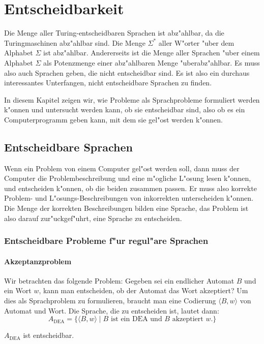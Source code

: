% 
%
\chapter{Entscheidbarkeit\label{chapter-entscheidbarkeit}}
\rhead{}
Die Menge aller Turing-entscheidbaren Sprachen ist abz"ahlbar,
da die Turingmaschinen abz"ahlbar sind.
Die Menge $\Sigma^*$ aller W"orter "uber dem Alphabet $\Sigma$ ist abz"ahlbar.
Andererseits ist die Menge aller Sprachen "uber einem Alphabet $\Sigma$
als Potenzmenge einer abz"ahlbaren Menge "uberabz"ahlbar. Es muss
also auch Sprachen geben, die nicht entscheidbar sind. Es ist also
ein durchaus interessantes Unterfangen, nicht entscheidbare Sprachen
zu finden.

In diesem Kapitel zeigen wir, wie Probleme als Sprachprobleme
formuliert werden k"onnen und untersucht werden kann, ob sie entscheidbar sind,
also ob es ein Computerprogramm geben kann, mit dem sie gel"ost werden
k"onnen.

\section{Entscheidbare Sprachen}
Wenn ein Problem von einem Computer gel"ost werden soll, dann
muss der Computer die Problembeschreibung und eine m"ogliche L"osung
lesen k"onnen, und entscheiden k"onnen, ob die beiden zusammen passen.
Er muss also korrekte Problem- und L"osungs-Beschreibungen von
inkorrekten unterscheiden k"onnen. Die Menge der korrekten
Beschreibungen bilden eine Sprache, das Problem ist also darauf
zur"uckgef"uhrt, eine Sprache zu entscheiden.

\subsection{Entscheidbare Probleme f"ur regul"are Sprachen}
\subsubsection{Akzeptanzproblem}
Wir betrachten das folgende Problem: Gegeben sei ein endlicher Automat $B$ und ein Wort $w$,
kann man entscheiden, ob der Automat das Wort akzeptiert?
Um dies als Sprachproblem zu formulieren, braucht  man eine Codierung
$\langle B,w\rangle$ von Automat und Wort. Die Sprache, die zu
entscheiden ist, lautet dann:
\[
A_{\text{DEA}} =\{
\langle B,w\rangle\;|\;\text{$B$ ist ein DEA und $B$ akzeptiert $w$}.
\}
\]
\begin{satz}
\label{adea_decidable}
$A_{\text{DEA}}$ ist entscheidbar.
\end{satz}

